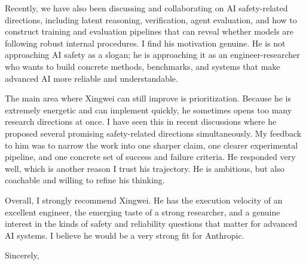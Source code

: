 \documentclass[11pt,a4paper]{letter}
\newcommand{\senderName}{Jie Fu}
\renewcommand{\closing}[1]{%
  \vspace{14pt}\noindent #1\\[46pt]
  \noindent{\bfseries\color{accent}\senderName}
}
\begin{document}
\begin{letter}{}
Recently, we have also been discussing and collaborating on AI safety-related
directions, including latent reasoning, verification, agent evaluation, and
how to construct training and evaluation pipelines that can reveal whether
models are following robust internal procedures. I find his motivation
genuine. He is not approaching AI safety as a slogan; he is approaching it as
an engineer-researcher who wants to build concrete methods, benchmarks, and
systems that make advanced AI more reliable and understandable.

The main area where Xingwei can still improve is prioritization. Because he
is extremely energetic and can implement quickly, he sometimes opens too many
research directions at once. I have seen this in recent discussions where he
proposed several promising safety-related directions simultaneously. My
feedback to him was to narrow the work into one sharper claim, one clearer
experimental pipeline, and one concrete set of success and failure criteria.
He responded very well, which is another reason I trust his trajectory. He is
ambitious, but also coachable and willing to refine his thinking.

Overall, I strongly recommend Xingwei. He has the execution velocity of an
excellent engineer, the emerging taste of a strong researcher, and a genuine
interest in the kinds of safety and reliability questions that matter for
advanced AI systems. I believe he would be a very strong fit for Anthropic.

\closing{Sincerely,}

\end{letter}
\end{document}
